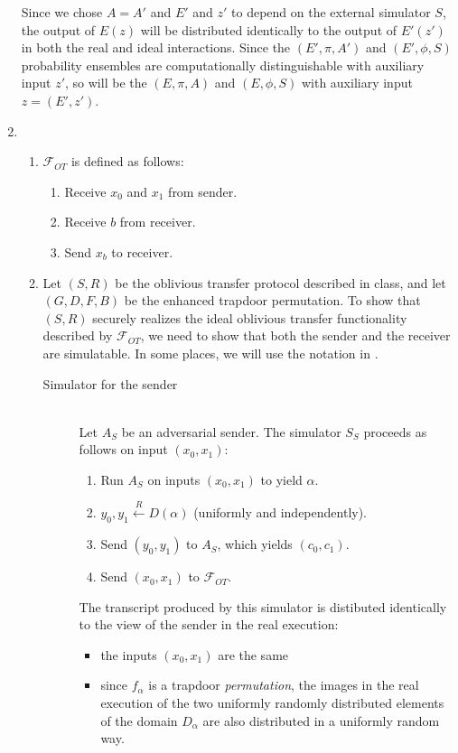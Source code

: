 \documentclass[draft]{article}
\newcommand{\getr}{\overset{R}{\gets}}
\begin{document}
\begin{enumerate}
  Since we chose $A=A'$ and $E'$ and $z'$ to depend on the external simulator $S$, the output of $E(z)$ will be distributed identically to the output of $E'(z')$ in both the real and ideal interactions.
  Since the $(E', \pi, A')$ and $(E', \phi, S)$ probability ensembles are computationally distinguishable with auxiliary input $z'$, so will be the $(E, \pi, A)$ and $(E, \phi, S)$ with auxiliary input $z=(E', z')$.
\item
  \begin{enumerate}
  \item $\mathcal{F}_{OT}$ is defined as follows:
    \begin{enumerate}
    \item Receive $x_0$ and $x_1$ from sender.
    \item Receive $b$ from receiver.
    \item Send $x_b$ to receiver.
    \end{enumerate}
  \item
    Let $(S, R)$ be the oblivious transfer protocol described in class, and let $(G, D, F, B)$ be the enhanced trapdoor permutation.
    To show that $(S, R)$ securely realizes the ideal oblivious transfer functionality described by $\mathcal{F}_{OT}$, we need to show that both the sender and the receiver are simulatable.
    In some places, we will use the notation in \cite{goldreich2}.
    \begin{description}
    \item[Simulator for the sender] \hfill \\
      Let $A_S$ be an adversarial sender.
      The simulator $S_S$ proceeds as follows on input $(x_0, x_1)$:
      \begin{enumerate}
      \item Run $A_S$ on inputs $(x_0, x_1)$ to yield $\alpha$.
      \item $y_0, y_1 \getr D(\alpha)$ (uniformly and independently).
      \item Send $(y_0, y_1)$ to $A_S$, which yields $(c_0, c_1)$.
      \item Send $(x_0, x_1)$ to $\mathcal{F}_{OT}$.
      \end{enumerate}
      The transcript produced by this simulator is distibuted identically to the view of the sender in the real execution:
      \begin{itemize}
      \item the inputs $(x_0, x_1)$ are the same
      \item since $f_\alpha$ is a trapdoor \emph{permutation}, the images in the real execution of the two uniformly randomly distributed elements of the domain $D_\alpha$ are also distributed in a uniformly random way.

\end{itemize}
\end{description}
\end{enumerate}
\end{enumerate}
\end{document}
